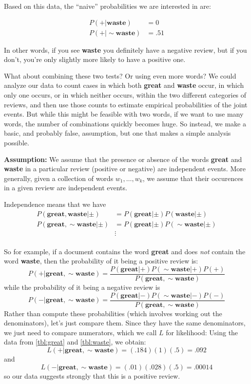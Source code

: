 \documentclass[
]{article}
\begin{document}
Based on this data, the ``naive'' probabilities we are interested in
are:

\begin{align*}
P(+|\mathbf{waste}) &= 0\\
P(+|\sim\mathbf{waste}) &= .51
\end{align*}

In other words, if you see \textbf{waste} you definitely have a negative
review, but if you don't, you're only slightly more likely to have a
positive one.

What about combining these two tests? Or using even more words? We could
analyze our data to count cases in which both \textbf{great} and
\textbf{waste} occur, in which only one occurs, or in which neither
occurs, within the two different categories of reviews, and then use
those counts to estimate empirical probabilities of the joint events.
But while this might be feasible with two words, if we want to use many
words, the number of combinations quickly becomes huge. So instead, we
make a basic, and probably false, assumption, but one that makes a
simple analysis possible.

\textbf{Assumption:} We assume that the presence or absence of the words
\textbf{great} and \textbf{waste} in a particular review (positive or
negative) are independent events. More generally, given a collection of
words \(w_1,\ldots, w_k\), we assume that their occurences in a given
review are independent events.

Independence means that we have \begin{align*}
P(\mathbf{great},\mathbf{waste}|\pm) &= P(\mathbf{great}|\pm)P(\mathbf{waste}|\pm)\\
P(\mathbf{great},\sim\mathbf{waste}|\pm) &= P(\mathbf{great}|\pm)P(\sim\mathbf{waste}|\pm)\\
 &\vdots \\
\end{align*}

So for example, if a document contains the word \textbf{great} and does
\emph{not} contain the word \textbf{waste}, then the probability of it
being a positive review is: \[
P(+|\mathbf{great},\sim\mathbf{waste}) = \frac{P(\mathbf{great}|+)P(\sim\mathbf{waste}|+)P(+)}{P(\mathbf{great},\sim\mathbf{waste})}
\] while the probability of it being a negative review is \[
P(-|\mathbf{great},\sim\mathbf{waste}) = \frac{P(\mathbf{great}|-)P(\sim\mathbf{waste}|-)P(-)}{P(\mathbf{great},\sim\mathbf{waste})}
\] Rather than compute these probabilities (which involves working out
the denominators), let's just compare them. Since they have the same
denominators, we just need to compare numerators, which we call \(L\)
for likelihood: Using the data from \cref{tbl:great} and
\cref{tbl:waste}, we obtain: \[
L(+|\mathbf{great},\sim\mathbf{waste}) = (.184)(1)(.5) = .092
\] and \[
L(-|\mathbf{great},\sim\mathbf{waste}) = (.01)(.028)(.5) = .00014
\] so our data suggests strongly that this is a positive review.
\end{document}
